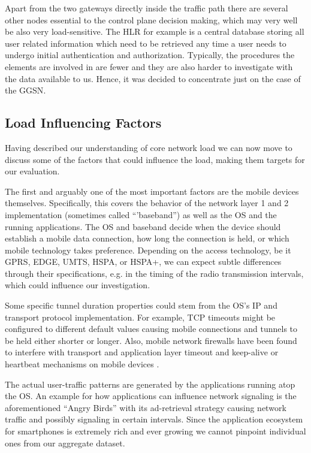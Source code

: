 Apart from the two gateways directly inside the traffic path there are several other nodes essential to the control plane decision making, which may very well be also very load-sensitive. The \gls{HLR} for example is a central database storing all user related information which need to be retrieved any time a user needs to undergo initial authentication and authorization. Typically, the procedures the elements are involved in are fewer and they are also harder to investigate with the data available to us. Hence, it was decided to concentrate just on the case of the \gls{GGSN}.


\subsection{Load Influencing Factors}

Having described our understanding of core network load we can now move to discuss some of the factors that could influence the load, making them targets for our evaluation.

The first and arguably one of the most important factors are the mobile devices themselves. Specifically, this covers the behavior of the network layer 1 and 2 implementation (sometimes called ``'baseband'') as well as the \gls{OS} and the running applications. The OS and baseband decide when the device should establish a mobile data connection, how long the connection is held, or which mobile technology takes preference. Depending on the access technology, be it \acrshort{GPRS}, \acrshort{EDGE}, \acrshort{UMTS}, \acrshort{HSPA}, or \acrshort{HSPA+}, we can expect subtle differences through their specifications, e.g. in the timing of the radio transmission intervals, which could influence our investigation. 

Some specific tunnel duration properties could stem from the \gls{OS}'s IP and transport protocol implementation. For example, TCP timeouts might be configured to different default values causing mobile connections and tunnels to be held either shorter or longer. Also, mobile network firewalls have been found to interfere with transport and application layer timeout and keep-alive or heartbeat mechanisms on mobile devices \cite{sigcomm11middleboxes}.

The actual user-traffic patterns are generated by the applications running atop the OS. An example for how applications can influence network signaling is the aforementioned ``Angry Birds'' with its ad-retrieval strategy causing network traffic and possibly signaling in certain intervals. Since the application ecosystem for smartphones is extremely rich and ever growing we cannot pinpoint individual ones from our aggregate dataset.

